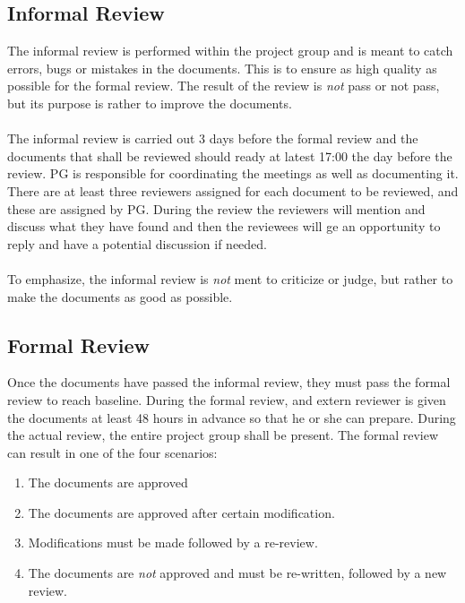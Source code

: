 \documentclass{article}
\begin{document}
    \subsection{Informal Review \label{informalreview}}
        The informal review is performed within the project group and is meant to catch
        errors, bugs or mistakes in the documents. This is to ensure as high quality
        as possible for the formal review. The result of the review is \emph{not} pass or
        not pass, but its purpose is rather to improve the documents.
        \\ \\
        The informal review is carried out 3 days before the formal review and the documents that
        shall be reviewed should ready at latest 17:00 the day before the review. PG is responsible
        for coordinating the meetings as well as documenting it.
        There are at least three reviewers assigned for each document to be reviewed, and these
        are assigned by PG. During the review the reviewers will mention and discuss what they have
        found and then the reviewees will ge an opportunity to reply and have a potential discussion
        if needed.
        \\ \\
        To emphasize, the informal review is \emph{not} ment to criticize or judge, but rather
        to make the documents as good as possible.
        
    
    \subsection{Formal Review \label{formalreview}}
        Once the documents have passed the informal review, they must pass the formal review
        to reach baseline. During the formal review, and extern reviewer is
        given the documents at least 48 hours in advance so that he or she can prepare.
        During the actual review, the entire project group shall be present.
        The formal review can result in one of the four scenarios:
        \begin{enumerate}
            \item The documents are approved
            \item The documents are approved after certain modification.
            \item Modifications must be made followed by a re-review.
            \item The documents are \emph{not} approved and must be re-written,
                    followed by a new review.
        \end{enumerate}
    
\end{document}
